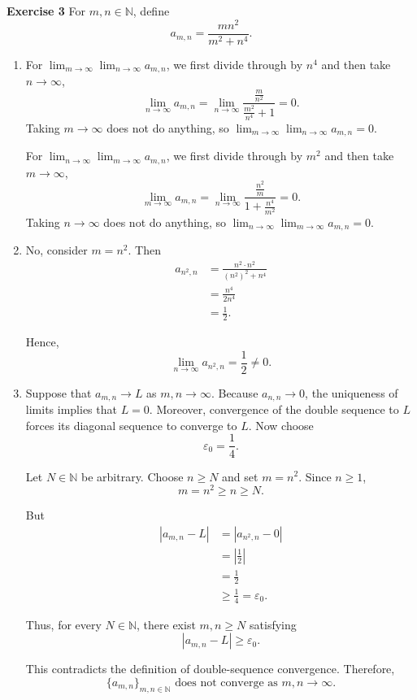 \documentclass[12pt]{article}
\begin{document}
\textbf{Exercise 3}
For \( m,n \in \mathbb{N} \), define
\[
    a_{m,n} = \frac{mn^2}{m^2 + n^4}.
\]
\begin{enumerate}[label=(\alph*)]
    \item For \( \lim_{m\to\infty}\lim_{n\to\infty}a_{m,n}\), we first divide through by \( n^4 \) and then take \( n \to \infty \),
          \[
              \lim_{n \to \infty} a_{m,n} = \lim_{n \to \infty} \frac{\frac{m}{n^2}}{\frac{m^2}{n^4} + 1} = 0.
          \]
          Taking \( m \to \infty \) does not do anything, so \( \lim_{m\to\infty}\lim_{n\to\infty}a_{m,n} = 0 \).

          For \( \lim_{n\to\infty}\lim_{m\to\infty}a_{m,n}\), we first divide through by \( m^2 \) and then take \( m \to \infty \),
          \[
              \lim_{m \to \infty} a_{m,n} = \lim_{n \to \infty} \frac{\frac{n^2}{m}}{1 + \frac{n^4}{m^2}} = 0.
          \]
          Taking \( n \to \infty \) does not do anything, so \( \lim_{n\to\infty}\lim_{m\to\infty}a_{m,n} = 0 \).

    \item No, consider \( m = n^2 \).
          Then
          \[
              \begin{aligned}
                  a_{n^2,n}
                   & =\frac{n^2\cdot n^2}{(n^2)^2+n^4} \\
                   & =\frac{n^4}{2n^4}                 \\
                   & =\frac12.
              \end{aligned}
          \]

          Hence,
          \[
              \lim_{n\to\infty}a_{n^2,n}=\frac12\neq0.
          \]

    \item Suppose that \(a_{m,n}\to L\) as \(m,n\to\infty\).
          Because \(a_{n,n}\to0\), the uniqueness of limits implies that \(L=0\). Moreover, convergence of the double sequence to \(L\) forces its diagonal sequence to converge to \(L\).
          Now choose
          \[
              \boxed{\varepsilon_0=\frac14}.
          \]

          Let \(N\in\mathbb N\) be arbitrary. Choose \(n\ge N\) and set \(m=n^2\). Since \(n\ge1\),
          \[
              m=n^2\ge n\ge N.
          \]

          But
          \[
              \begin{aligned}
                  |a_{m,n}-L|
                   & =|a_{n^2,n}-0|            \\
                   & =\left|\frac12\right|     \\
                   & =\frac12                  \\
                   & \ge\frac14=\varepsilon_0.
              \end{aligned}
          \]

          Thus, for every \(N\in\mathbb N\), there exist \(m,n\ge N\) satisfying
          \[
              |a_{m,n}-L|\ge\varepsilon_0.
          \]

          This contradicts the definition of double-sequence convergence.
          Therefore,
          \[
              \{a_{m,n}\}_{m,n\in\mathbb N}\text{ does not converge as }m,n\to\infty.
          \]
\end{enumerate}
\end{document}
